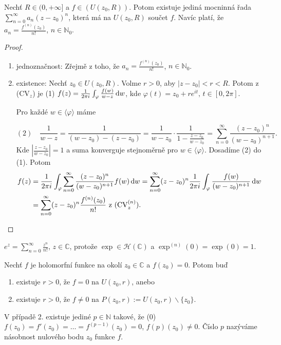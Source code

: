 \begin{theorem}
Nechť $R \in (0, +\infty]$ a $f \in (U(z_0,R))$. Potom existuje jediná mocninná řada $\sum\limits _{n=0} ^{\infty} a_n(z-z_0)^n$, která má na $U(z_0,R)$ součet $f$. Navíc platí, že $a_n=\frac{f^{(n)}(z_0)}{n!}$, $n \in \mathbb{N}_0$.
\end{theorem}

\begin{proof}
\begin{enumerate}
    \item jednoznačnost: Zřejmě z toho, že $a_n=\frac{f^{(n)}(z_0)}{n!}$, $n \in \mathbb{N}_0$.
    \item existence: Nechť $z_0 \in U(z_0, R)$. Volme $r>0$, aby $|z-z_0|<r<R$. Potom z (CV$_z$) je (1) $f(z)=\frac{1}{2 \pi i} \int_\varphi \frac{f(w)}{w-z} \mathop{}\!\mathrm{d} w$, kde $\varphi(t)=z_0+re^{it} \text{, } t \in [0, 2\pi]$.
    
    Pro každé $w \in \langle \varphi \rangle$ máme
    
    $$(2) \quad \frac{1}{w-z}=\frac{1}{(w-z_0)-(z-z_0)}=\frac{1}{w-z_0}\cdot\frac{1}{1-\frac{z-z_0}{w-z_0}}=\sum_{n=0}^\infty \frac{(z-z_0)^n}{(w-z_0)^{n+1}} \text{.}$$
    Kde $|\frac{z-z_0}{w-z_0}|=1$ a suma konverguje stejnoměrně pro $w \in  \langle \varphi \rangle$. Dosadíme (2) do (1). Potom
    \begin{equation*}
        \begin{split}
    f(z) &=\frac{1}{2 \pi i} \int_\varphi \sum_{n=0}^\infty \frac{(z-z_0)^n}{(w-z_0)^{n+1}} f(w) \mathop{}\!\mathrm{d} w= 
    \sum_{n=0}^\infty (z-z_0)^n \frac{1}{2 \pi i} \int_\varphi \frac{f(w)}{(w-z_0)^{n+1}} \mathop{}\!\mathrm{d} w \\
     &=\sum_{n=0}^\infty (z-z_0)^n \frac{f^{(n)}(z_0)}{n!} \text{ z (CV}_z^{(n)} \text{).}
     \end{split}
    \end{equation*}
\end{enumerate}
\end{proof}

\begin{example}
$e^z=\sum\limits_{n=0}^\infty \frac{z^n}{n!}$, $z \in \mathbb{C}$, protože $\exp \in \mathcal{H}(\mathbb{C})$ a $\exp^{(n)}(0)=\exp(0)=1$.
\end{example}

\begin{theorem}
Nechť $f$ je holomorfní funkce na okolí $z_0 \in \mathbb{C}$ a $f(z_0)=0$. Potom buď
\begin{enumerate}
    \item existuje $r>0$, že $f=0$ na $U(z_0,r)$, anebo
    \item existuje $r>0$, že $f\neq 0$ na $P(z_0,r):=U(z_0,r)\backslash \{z_0\}$.
\end{enumerate}
V případě 2. existuje jediné $p\in \mathbb{N}$ takové, že (0) $f(z_0)=f'(z_0)= \ldots = f^{(p-1)}(z_0)=0$, $f{(p)}(z_0) \neq 0$. Číslo $p$ nazýváme násobnost nulového bodu $z_0$ funkce $f$.
\end{theorem}

